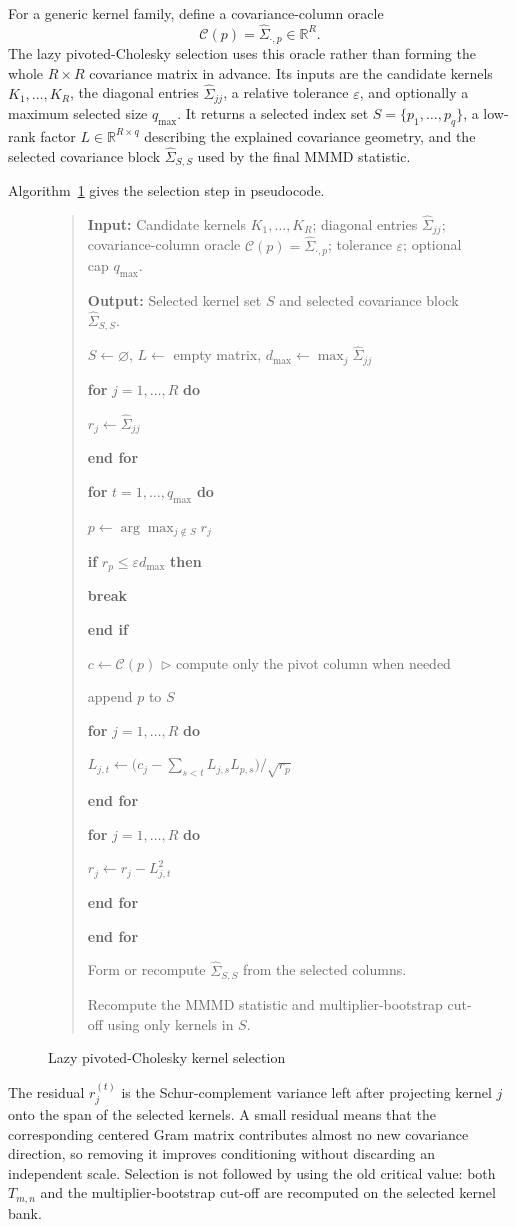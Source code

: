 \documentclass[12pt]{article}
\newenvironment{algorithm}[1][]{\begin{figure}[H]\small}{\end{figure}}
\newenvironment{algorithmic}[1][]{\begin{quote}\small}{\end{quote}}
\newcommand{\Require}{\par\noindent\textbf{Input:} }
\newcommand{\Ensure}{\par\noindent\textbf{Output:} }
\newcommand{\State}{\par\noindent}
\newcommand{\For}[1]{\par\noindent\textbf{for} #1 \textbf{do}}
\newcommand{\EndFor}{\par\noindent\textbf{end for}}
\newcommand{\If}[1]{\par\noindent\textbf{if} #1 \textbf{then}}
\newcommand{\EndIf}{\par\noindent\textbf{end if}}
\newcommand{\Comment}[1]{\hfill{\(\triangleright\) #1}}
\begin{document}
For a generic kernel family, define a covariance-column oracle
\[
  \mathcal{C}(p)=\widehat{\Sigma}_{\cdot,p}\in\mathbb{R}^{R}.
\]
The lazy pivoted-Cholesky selection uses this oracle rather than forming the whole $R\times R$ covariance matrix in advance. Its inputs are the candidate kernels $K_1,\ldots,K_R$, the diagonal entries $\widehat{\Sigma}_{jj}$, a relative tolerance $\varepsilon$, and optionally a maximum selected size $q_{\max}$. It returns a selected index set $S=\{p_1,\ldots,p_q\}$, a low-rank factor $L\in\mathbb{R}^{R\times q}$ describing the explained covariance geometry, and the selected covariance block $\widehat{\Sigma}_{S,S}$ used by the final MMMD statistic.

Algorithm~\ref{alg:lazy-pchol} gives the selection step in pseudocode.

\begin{algorithm}[H]
\caption{Lazy pivoted-Cholesky kernel selection}
\label{alg:lazy-pchol}
\begin{algorithmic}[1]
\Require Candidate kernels $K_1,\ldots,K_R$; diagonal entries $\widehat{\Sigma}_{jj}$; covariance-column oracle $\mathcal{C}(p)=\widehat{\Sigma}_{\cdot,p}$; tolerance $\varepsilon$; optional cap $q_{\max}$.
\Ensure Selected kernel set $S$ and selected covariance block $\widehat{\Sigma}_{S,S}$.
\State $S\gets\varnothing$, $L\gets$ empty matrix, $d_{\max}\gets\max_j\widehat{\Sigma}_{jj}$
\For{$j=1,\ldots,R$}
  \State $r_j\gets\widehat{\Sigma}_{jj}$
\EndFor
\For{$t=1,\ldots,q_{\max}$}
  \State $p\gets\arg\max_{j\notin S} r_j$
  \If{$r_p\le\varepsilon d_{\max}$}
    \State \textbf{break}
  \EndIf
  \State $c\gets\mathcal{C}(p)$ \Comment{compute only the pivot column when needed}
  \State append $p$ to $S$
  \For{$j=1,\ldots,R$}
    \State $L_{j,t}\gets\big(c_j-\sum_{s<t}L_{j,s}L_{p,s}\big)/\sqrt{r_p}$
  \EndFor
  \For{$j=1,\ldots,R$}
    \State $r_j\gets r_j-L_{j,t}^2$
  \EndFor
\EndFor
\State Form or recompute $\widehat{\Sigma}_{S,S}$ from the selected columns.
\State Recompute the MMMD statistic and multiplier-bootstrap cut-off using only kernels in $S$.
\end{algorithmic}
\end{algorithm}
The residual $r_j^{(t)}$ is the Schur-complement variance left after projecting kernel $j$ onto the span of the selected kernels. A small residual means that the corresponding centered Gram matrix contributes almost no new covariance direction, so removing it improves conditioning without discarding an independent scale. Selection is not followed by using the old critical value: both $T_{m,n}$ and the multiplier-bootstrap cut-off are recomputed on the selected kernel bank.
\end{document}
